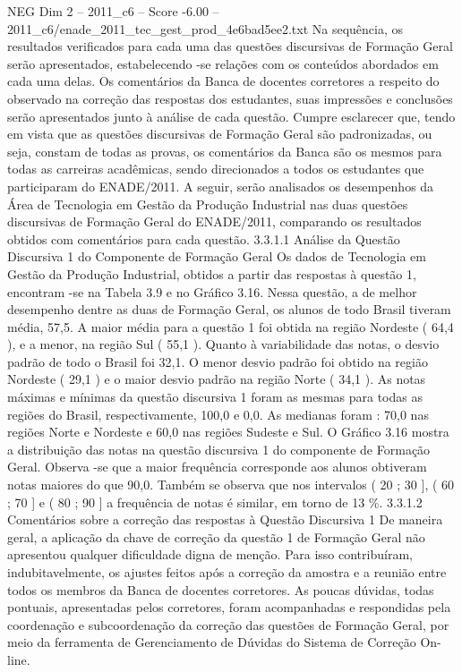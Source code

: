 \begin{textsample}{NEG Dim 2 – 2011\_c6 – Score -6.00 – 2011\_c6/enade\_2011\_tec\_gest\_prod\_4e6bad5ee2.txt}
Na sequência, os resultados verificados para cada uma das questões discursivas de Formação Geral serão apresentados, estabelecendo -se relações com os conteúdos abordados em cada uma delas.
Os comentários da Banca de docentes corretores a respeito do observado na correção das respostas dos estudantes, suas impressões e conclusões serão apresentados junto à análise de cada questão.
Cumpre esclarecer que, tendo em vista que as questões discursivas de Formação Geral são padronizadas, ou seja, constam de todas as provas, os comentários da Banca são os mesmos para todas as carreiras acadêmicas, sendo direcionados a todos os estudantes que participaram do ENADE/2011.
A seguir, serão analisados os desempenhos da Área de Tecnologia em Gestão da Produção Industrial nas duas questões discursivas de Formação Geral do ENADE/2011, comparando os resultados obtidos com comentários para cada questão. 3.3.1.1 Análise da Questão Discursiva 1 do Componente de Formação Geral Os dados de Tecnologia em Gestão da Produção Industrial, obtidos a partir das respostas à questão 1, encontram -se na Tabela 3.9 e no Gráfico 3.16.
Nessa questão, a de melhor desempenho dentre as duas de Formação Geral, os alunos de todo Brasil tiveram média, 57,5.
A maior média para a questão 1 foi obtida na região Nordeste ( 64,4 ), e a menor, na região Sul ( 55,1 ).
Quanto à variabilidade das notas, o desvio padrão de todo o Brasil foi 32,1.
O menor desvio padrão foi obtido na região Nordeste ( 29,1 ) e o maior desvio padrão na região Norte ( 34,1 ).
As notas máximas e mínimas da questão discursiva 1 foram as mesmas para todas as regiões do Brasil, respectivamente, 100,0 e 0,0.
As medianas foram : 70,0 nas regiões Norte e Nordeste e 60,0 nas regiões Sudeste e Sul.
O Gráfico 3.16 mostra a distribuição das notas na questão discursiva 1 do componente de Formação Geral.
Observa -se que a maior frequência corresponde aos alunos obtiveram notas maiores do que 90,0.
Também se observa que nos intervalos ( 20 ; 30 ], ( 60 ; 70 ] e ( 80 ; 90 ] a frequência de notas é similar, em torno de 13 \%. 3.3.1.2 Comentários sobre a correção das respostas à Questão Discursiva 1 De maneira geral, a aplicação da chave de correção da questão 1 de Formação Geral não apresentou qualquer dificuldade digna de menção.
Para isso contribuíram, indubitavelmente, os ajustes feitos após a correção da amostra e a reunião entre todos os membros da Banca de docentes corretores.
As poucas dúvidas, todas pontuais, apresentadas pelos corretores, foram acompanhadas e respondidas pela coordenação e subcoordenação da correção das questões de Formação Geral, por meio da ferramenta de Gerenciamento de Dúvidas do Sistema de Correção On-line.

\end{textsample}
